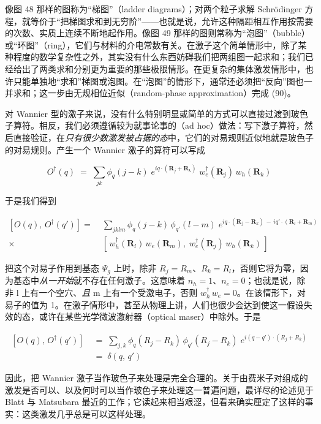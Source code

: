 像图 48 那样的图称为“梯图”（ladder diagrams）；对两个粒子求解 Schrödinger 方程，就等价于“把梯图求和到无穷阶”——也就是说，允许这种隔距相互作用按需要的次数、实质上连续不断地起作用。像图 49 那样的图则常称为“泡图”（bubble）或“环图”（ring），它们与材料的介电常数有关。在激子这个简单情形中，除了某种程度的数学复杂性之外，其实没有什么东西妨碍我们把两组图一起求和；我们已经给出了两类求和分别更为重要的那些极限情形。在更复杂的集体激发情形中，也许只能单独地“求和”梯图或泡图。在“泡图”的情形下，通常还必须把“反向”图也一并求和；这一步由无规相位近似（random-phase approximation）完成 (90)。

对 Wannier 型的激子来说，没有什么特别明显或简单的方式可以直接过渡到玻色子算符。相反，我们必须遵循较为就事论事的（ad hoc）做法：写下激子算符，然后直接验证，在\emph{只有很少数激发被占据的态}中，它们的对易规则近似地就是玻色子的对易规则。产生一个 Wannier 激子的算符可以写成

\begin{equation*}
O^{\dagger}(q) \;=\; \sum_{jk}\phi_q(j-k)\;e^{iq\cdot\left(\mathbf{R}_j + \mathbf{R}_k\right)}\;w_e^{\dagger}(\mathbf{R}_j)\,w_h(\mathbf{R}_k)
\end{equation*}

于是我们得到

\begin{align*}
\left[O(q),\,O^{\dagger}(q')\right] =\; & \sum_{jklm}\phi_q(j-k)\,\phi_{q'}(l-m)\;e^{iq\cdot\left(\mathbf{R}_j - \mathbf{R}_k\right)\,-\,iq'\cdot\left(\mathbf{R}_l + \mathbf{R}_m\right)} \\
\times\; & \left[\,w_h^{\dagger}(\mathbf{R}_l)\,w_e(\mathbf{R}_m),\;w_e^{\dagger}(\mathbf{R}_j)\,w_h(\mathbf{R}_k)\,\right]
\end{align*}

把这个对易子作用到基态 $\Psi_g$ 上时，除非 $R_j = R_m$、$R_k = R_l$，否则它将为零，因为基态中\emph{从一开始}就不存在任何激子。这意味着 $n_h = 1$、$n_e = 0$；也就是说，除非 l 上有一个空穴、\emph{且} m 上有一个受激电子，否则 $w_h^{\dagger}\,w_e = 0$。在该情形下，对易子的值为 1。在激子情形中，甚至从物理上讲，人们也很少会达到使这一假设失效的态，或许在某些光学微波激射器（optical maser）中除外。于是

\begin{align*}
\left[O(q),\,O^{\dagger}(q')\right]\;&=\;\sum_{j,k}\phi_q(R_j - R_k)\,\phi_{q'}(R_j - R_k)\;e^{i(q-q')\cdot\left(R_j + R_k\right)} \\
&=\;\delta(q,\,q')
\end{align*}

因此，把 Wannier 激子当作玻色子来处理是完全合理的。关于由费米子对组成的激发是否可以、以及何时可以当作玻色子来处理这一普遍问题，最详尽的论述见于 Blatt 与 Matsubara 最近的工作；它读起来相当艰涩，但看来确实厘定了这样的事实：这类激发几乎总是可以这样处理。

